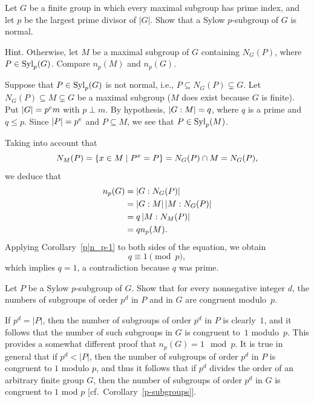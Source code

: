 \begin{probl}\label{problem-1.C.7}
    Let $G$ be a finite group in which every maximal subgroup has prime index, and let $p$ be the largest prime divisor of\/ $|G|$. Show that a Sylow $p$-subgroup of\/ $G$ is normal.

    \textrm{\upshape Hint. Otherwise, let $M$ be a maximal subgroup of $G$ containing $N_G(P)$, where $P\in{\rm Syl}_p(G)$. Compare $n_{p}(M)$ and $n_p(G)$.}
\end{probl}

\begin{solution} Suppose that $P\in{\rm Syl}_p(G)$ is not normal, i.e., $P\subseteq N_G(P)\varsubsetneq G$. Let $N_G(P)\subseteq M\varsubsetneq G$ be a maximal subgroup ($M$ does exist because $G$ is finite). Put $\left\vert{G}\right\vert=p^em$ with $p\perp m$. By hypothesis, $\left\vert{G:M}\right\vert=q$, where $q$ is a prime and $q\le p$. Since $\left\vert{P}\right\vert=p^e$ and $P\subseteq M$, we see that $P\in{\rm Syl}_p(M)$. %


Taking into account that
$$
    N_M(P)=\{x\in M\mid P^x=P\} = N_G(P)\cap M= N_G(P),
$$
we deduce that %
\begin{align*}
    n_p(G) &= |G:N_G(P)|\\
        &= \left\vert{G:M}\right\vert|M:N_G(P)|\\
        &= q\left\vert{M:N_M(P)}\right\vert\\
        &= qn_p(M).
\end{align*}
Applying Corollary~\ref{p|n_p-1} to both sides of the equation, we obtain
$$
    q\equiv1\pmod p,
$$
which implies $q=1$, a contradiction because $q$ was prime.  \end{solution}

\begin{probl}\label{problem-1.C.8}
    Let\/ $P$ be a Sylow\/ $p$-subgroup of\/ $G$. Show that for every nonnegative integer\/ $d$, the numbers of subgroups of order\/ $p^d$ in\/ $P$ and in\/ $G$ are congruent modulo\/~$p$.

    \textrm{ If $p^d = |P|$, then the number of subgroups of order $p^d$ in $P$ is clearly~$1$, and it follows that the number of such subgroups in $G$ is congruent to~$1$ modulo~$p$. This provides a somewhat different proof that $n_p(G) = 1 \mod p$. It is true in general that if $p^d < |P|$, then the number of subgroups of order $p^d$ in $P$ is congruent to $1$ modulo $p$, and thus it follows that if $p^d$ divides the order of an arbitrary finite group $G$, then the number of subgroups of order $p^d$ in $G$ is congruent to $1$ mod $p$ [cf.~Corollary~\ref{p-subgroups}].}
\end{probl}

